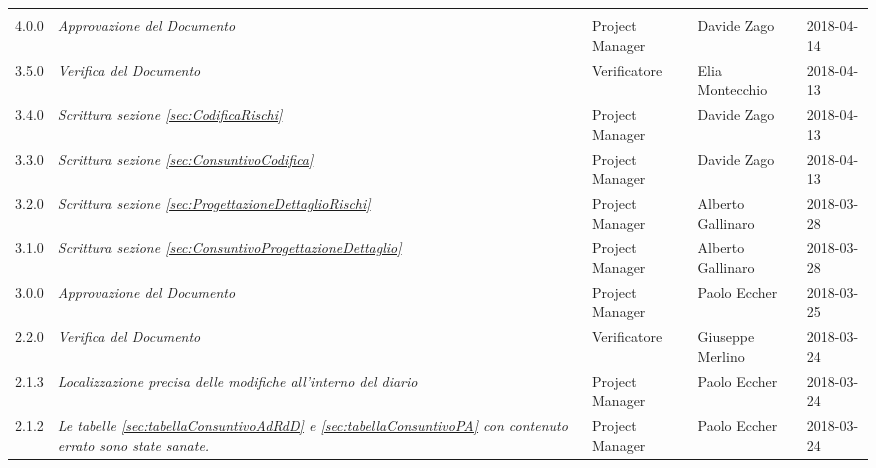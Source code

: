 \newpage 
\section*{}
	\begin{longtable}[H]{C{2cm}|C{4cm}|C{3cm}|C{3cm}|R{2cm}}
		
		 & & & &  \\
		
		
		4.0.0 &\emph{Approvazione del Documento} & Project Manager & Davide Zago & 2018-04-14 \\
		\hline
		
		3.5.0 &\emph{Verifica del Documento} & Verificatore & Elia Montecchio & 2018-04-13 \\
		\hline
		
		3.4.0 &\emph{Scrittura sezione \ref{sec:CodificaRischi}} & Project Manager &  Davide Zago & 2018-04-13 \\
		\hline
		
		3.3.0 &\emph{Scrittura sezione \ref{sec:ConsuntivoCodifica}} & Project Manager &  Davide Zago & 2018-04-13 \\
		\hline

		3.2.0 &\emph{Scrittura sezione \ref{sec:ProgettazioneDettaglioRischi}} & Project Manager & Alberto Gallinaro & 2018-03-28 \\
		\hline	
		
		3.1.0 &\emph{Scrittura sezione \ref{sec:ConsuntivoProgettazioneDettaglio}} & Project Manager & Alberto Gallinaro & 2018-03-28 \\
		\hline
		
		3.0.0 &\emph{Approvazione del Documento} & Project Manager & Paolo Eccher & 2018-03-25 \\
		\hline
		
		2.2.0 &\emph{Verifica del Documento} & Verificatore & Giuseppe Merlino & 2018-03-24 \\
		\hline
		
		2.1.3 &\emph{Localizzazione precisa delle modifiche all'interno del diario} & Project Manager & Paolo Eccher & 2018-03-24 \\
		\hline
		
		2.1.2 &\emph{ Le tabelle \ref{sec:tabellaConsuntivoAdRdD} e \ref{sec:tabellaConsuntivoPA} con contenuto errato sono state sanate.} & Project Manager & Paolo Eccher & 2018-03-24 \\
		\hline
		

\end{longtable}
